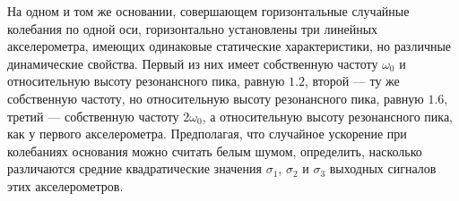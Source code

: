 На одном и том же основании, совершающем горизонтальные случайные колебания
по одной оси, горизонтально установлены три линейных акселерометра,
имеющих одинаковые статические характеристики,
но различные динамические свойства.
Первый из них имеет собственную частоту $\omega _0$ и относительную высоту
резонансного пика, равную $1.2$, второй --- ту же собственную частоту,
но относительную высоту резонансного пика, равную $1.6$,
третий --- собственную частоту $2\omega _0$, а относительную высоту
резонансного пика, как у первого акселерометра.
Предполагая, что случайное ускорение при колебаниях основания
можно считать белым шумом, определить, насколько различаются средние
квадратические значения $\sigma _1$, $\sigma _2$ и $\sigma _3$
выходных сигналов этих акселерометров.
